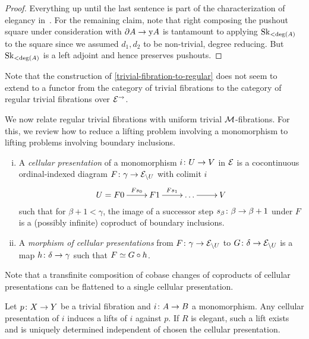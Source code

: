 \documentclass[reqno,10pt,a4paper,oneside,draft]{amsart}
\begin{document}
{{\begin{proof}
Everything up until the last sentence is part of the characterization of elegancy in~\cite[Proposition~3.8]{bergner-rezk-elegant}.
For the remaining claim, note that right composing the pushout square under consideration with $\partial A \to \yon A$ is tantamount to applying $\Sk_{<\deg(A)}$ to the square since we assumed $d_1, d_2$ to be non-trivial, \ie degree reducing.
But $\Sk_{<\deg(A)}$ is a left adjoint and hence preserves pushouts.
\end{proof}

Note that the construction of \cref{trivial-fibration-to-regular} does not seem to extend to a functor from the category of trivial fibrations to the category of regular trivial fibrations over $\catE^{\to}$.

\medskip

We now relate regular trivial fibrations with uniform trivial $\cal{M}$-fibrations.
For this, we review how to reduce a lifting problem involving a monomorphism to lifting problems involving boundary inclusions.

\begin{definition} \hfill
\begin{enumerate}[(i)]
\item A \emph{cellular presentation} of a monomorphism $i \co U \to V$ in $\catE$ is a cocontinuous ordinal-indexed diagram $F \co \gamma \to \catE_{\backslash U}$ with colimit $i$
\[
\xymatrix{
  U = F 0
  \ar[r]^-{F s_0}
&
  F 1
  \ar[r]^{F s_1}
&
  \ldots
  \ar[r]
&
  V
}
\]
such that for $\beta + 1 < \gamma$, the image of a successor step $s_{\beta} \co \beta \to \beta + 1$ under $F$ is a (possibly infinite) coproduct of boundary inclusions.
\item A \emph{morphism of cellular presentations} from $F \co \gamma \to \cal{E}_{\backslash U}$ to $G \co \delta \to \cal{E}_{\backslash U}$ is a map $h \co \delta \to \gamma$ such that $F \simeq G \cc h$.
\end{enumerate}
\end{definition}

Note that a transfinite composition of cobase changes of coproducts of cellular presentations can be flattened to a single cellular presentation.

\begin{remark} \label{elegant-reedy-lift-independent-of-cellular-presentation}
Let $p \co X \to Y$ be a trivial fibration and $i \co A \to B$ a monomorphism.
Any cellular presentation of $i$ induces a lifts of $i$ against $p$.
If $R$ is elegant, such a lift exists and is uniquely determined independent of chosen the cellular presentation.


\end{remark}}}
\end{document}
